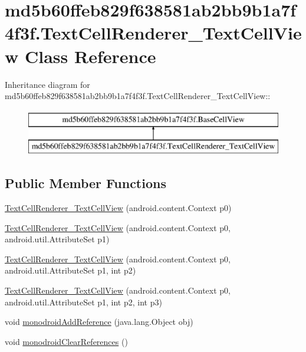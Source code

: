 \hypertarget{classmd5b60ffeb829f638581ab2bb9b1a7f4f3f_1_1_text_cell_renderer___text_cell_view}{
\section{md5b60ffeb829f638581ab2bb9b1a7f4f3f.TextCellRenderer\_\-TextCellView Class Reference}
\label{classmd5b60ffeb829f638581ab2bb9b1a7f4f3f_1_1_text_cell_renderer___text_cell_view}
}
Inheritance diagram for md5b60ffeb829f638581ab2bb9b1a7f4f3f.TextCellRenderer\_\-TextCellView::\begin{figure}[H]
\begin{center}
\leavevmode
\includegraphics[height=2cm]{classmd5b60ffeb829f638581ab2bb9b1a7f4f3f_1_1_text_cell_renderer___text_cell_view}
\end{center}
\end{figure}
\subsection*{Public Member Functions}
\begin{CompactItemize}
\item 
\hyperlink{classmd5b60ffeb829f638581ab2bb9b1a7f4f3f_1_1_text_cell_renderer___text_cell_view_fe6c7e7e2a7fabcc9de2be5e1213ec39}{TextCellRenderer\_\-TextCellView} (android.content.Context p0)
\item 
\hyperlink{classmd5b60ffeb829f638581ab2bb9b1a7f4f3f_1_1_text_cell_renderer___text_cell_view_d18530bfd08906cd61bff0c0f121c982}{TextCellRenderer\_\-TextCellView} (android.content.Context p0, android.util.AttributeSet p1)
\item 
\hyperlink{classmd5b60ffeb829f638581ab2bb9b1a7f4f3f_1_1_text_cell_renderer___text_cell_view_4091a02a6c6480481b17fb51db97a2cc}{TextCellRenderer\_\-TextCellView} (android.content.Context p0, android.util.AttributeSet p1, int p2)
\item 
\hyperlink{classmd5b60ffeb829f638581ab2bb9b1a7f4f3f_1_1_text_cell_renderer___text_cell_view_19fd5743b7678bd5ed7a895ae1a015bc}{TextCellRenderer\_\-TextCellView} (android.content.Context p0, android.util.AttributeSet p1, int p2, int p3)
\item 
void \hyperlink{classmd5b60ffeb829f638581ab2bb9b1a7f4f3f_1_1_text_cell_renderer___text_cell_view_fc8a91c0d40ccce034289e75cb64e36a}{monodroidAddReference} (java.lang.Object obj)
\item 
void \hyperlink{classmd5b60ffeb829f638581ab2bb9b1a7f4f3f_1_1_text_cell_renderer___text_cell_view_8a90317f45055f6bdc8b99196ff5d3c5}{monodroidClearReferences} ()
\end{CompactItemize}
